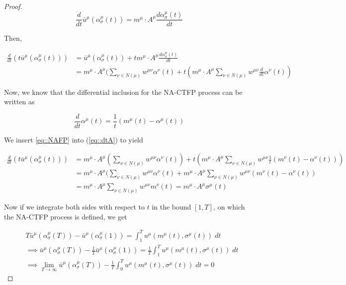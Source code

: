 \documentclass{article}
\theoremstyle{definition}
\begin{document}
\begin{proof}
    \begin{equation}
      \frac{d}{dt} \bar{u}^\mu (\alpha_\sigma^\mu (t)) = m^\mu \cdot A^\mu \frac{d \alpha_\sigma^\mu (t)}{dt}
    \end{equation}

    Then, 

    \begin{align} \label{eq::dtA}
      \frac{d}{dt} (t \bar{u}^\mu (\alpha_\sigma^\mu (t))) & =  \bar{u}^\mu (\alpha_\sigma^\mu (t)) + t m^\mu \cdot A^\mu \frac{d \alpha_\sigma^\mu (t)}{dt} \nonumber \\
      & = m^\mu \cdot A^\mu (\sum_{\nu \in N(\mu)} w^{\mu \nu} \alpha^\nu (t) + t (m^\mu \cdot A^\mu \sum_{\nu \in N(\mu)} w^{\mu \nu} \frac{d}{dt} \alpha^\nu(t))
    \end{align} 

    Now, we know that the differential inclusion for the NA-CTFP process can be written as

    \begin{equation} \label{eq::NAFP}
      \frac{d}{dt} \alpha^\mu (t) = \frac{1}{t} (m^\mu(t) - \alpha^\mu (t))
    \end{equation}

    We insert \ref{eq::NAFP} into (\ref{eq::dtA}) to yield

    \begin{align}
      \frac{d}{dt} (t \bar{u}^\mu (\alpha_\sigma^\mu (t))) & = m^\mu \cdot A^\mu (\sum_{\nu \in N(\mu)} w^{\mu \nu} \alpha^\nu (t)) + t(m^\mu \cdot A^\mu \sum_{\nu \in N(\mu)} w^{\mu \nu} \frac{1}{t} (m^\nu(t) - \alpha^\nu (t))) \nonumber \\
      & = m^\mu \cdot A^\mu (\sum_{\nu \in N(\mu)} w^{\mu \nu} \alpha^\nu (t) + m^\mu \cdot A^\mu \sum_{\nu \in N(\mu)} w^{\mu \nu} (m^\nu(t) - \alpha^\nu (t)) \nonumber \\
      & = m^\mu \cdot A^\mu \sum_{\nu \in N(\mu)} w^{\mu \nu} m^\nu(t) = m^\mu \cdot A^\mu \sigma^\mu(t) 
    \end{align}


    Now if we integrate both sides with respect to $t$ in the bound $[1, T]$, on which the NA-CTFP process is defined, we get

    \begin{align*}
      &  T \bar{u}^\mu (\alpha_\sigma^\mu (T)) - \bar{u}^\mu (\alpha_\sigma^\mu (1)) = \int_1^T u^\mu (m^\mu(t), \sigma^\mu(t)) \; dt \\
      & \implies \bar{u}^\mu (\alpha_\sigma^\mu (T)) - \frac{1}{T} \bar{u}^\mu (\alpha_\sigma^\mu (1)) = \frac{1}{T} \int_1^T u^\mu (m^\mu(t), \sigma^\mu(t)) \; dt \\
      & \implies \lim_{T \rightarrow \infty} \bar{u}^\mu (\alpha_\sigma^\mu (T)) - \frac{1}{T} \int_0^T u^\mu (m^\mu(t), \sigma^\mu(t)) \; dt = 0
    \end{align*}


\end{proof}
\end{document}
